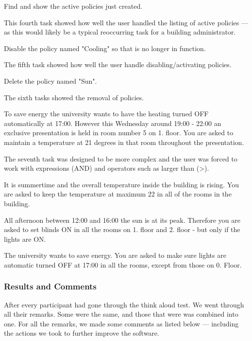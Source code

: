 \begin{framed}
Find and show the active policies just created.
\end{framed}
This fourth task showed how well the user handled the listing of active policies --- as this would likely be a typical reoccurring task for a building administrator.

\begin{framed}
Disable the policy named "Cooling" so that is no longer in function.
\end{framed}
The fifth task showed how well the user handle disabling/activating policies.

\begin{framed}
Delete the policy named "Sun".
\end{framed}
The sixth tasks showed the removal of policies.

\begin{framed}
To save energy the university wants to have the heating turned OFF automatically at 17:00. However this Wednesday around 19:00 - 22:00 an exclusive presentation is held in room number 5 on 1. floor.
You are asked to maintain a temperature at 21 degrees in that room throughout the presentation.
\end{framed}
The seventh task was designed to be more complex and the user was forced to work with expressions (AND) and operators such as larger than (\textgreater).

\begin{framed}
It is summertime and the overall temperature inside the building is rising. You are asked to keep the temperature at maximum 22 in all of the rooms in the building.
\end{framed}

\begin{framed}
All afternoon between 12:00 and 16:00 the sun is at its peak. Therefore you are asked to set blinds ON in all the rooms on 1. floor and 2. floor - but only if the lights are ON.
\end{framed}

\begin{framed}
The university wants to save energy. You are asked to make sure lights are automatic turned OFF at 17:00 in all the rooms, except from those on 0. Floor.
\end{framed}

\subsubsection{Results and Comments}
\label{results-and-comments}
After every participant had gone through the think aloud test. We went through all their remarks. Some were the same, and those that were was combined into one.
For all the remarks, we made some comments as listed below --- including the actions we took to further improve the software.

